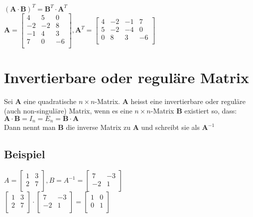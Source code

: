 \documentclass[../main.tex]{subfiles}
\begin{document}
$(\mathbf{A} \cdot \mathbf{B})^T=\mathbf{B}^T \cdot \mathbf{A}^T$ \\ [7pt]

$\mathbf{A} = 
\begin{bmatrix}
    4 & 5 & 0 \\
    -2 & -2 & 8 \\
    -1 & 4 & 3 \\
    7 & 0 & -6 \\
\end{bmatrix},
\mathbf{A}^T = 
\begin{bmatrix}
    4 & -2 & -1 & 7 \\
    5 & -2 & -4 & 0 \\
    0 & 8 & 3 & -6 \\
\end{bmatrix}$

\section{Invertierbare oder reguläre Matrix}
Sei $\mathbf{A}$ eine quadratische $n\times n$-Matrix. $\mathbf{A}$ heisst eine invertierbare oder reguläre 
(auch non-singuläre) Matrix, wenn es eine $n\times n$-Matrix $\mathbf{B}$ existiert so, dass: \\ [7pt]
$\mathbf{A} \cdot \mathbf{B} = I_n = E_n = \mathbf{B} \cdot \mathbf{A}$ \\ [7pt]
Dann nennt man $\mathbf{B}$ die inverse Matrix zu $\mathbf{A}$ und schreibt sie als $\mathbf{A}^{-1}$

\subsection{Beispiel}
$A=
\begin{bmatrix}
    1 & 3 \\
    2 & 7 \\
\end{bmatrix},
B=A^{-1}=
\begin{bmatrix}
    7 & -3 \\
    -2 & 1 \\
\end{bmatrix}$ \\ [7pt]

$\begin{bmatrix}
    1 & 3 \\
    2 & 7 \\
\end{bmatrix} \cdot
\begin{bmatrix}
    7 & -3 \\
    -2 & 1 \\
\end{bmatrix}
=
\begin{bmatrix}
    1 & 0 \\
    0 & 1 \\
\end{bmatrix}$
\end{document}
